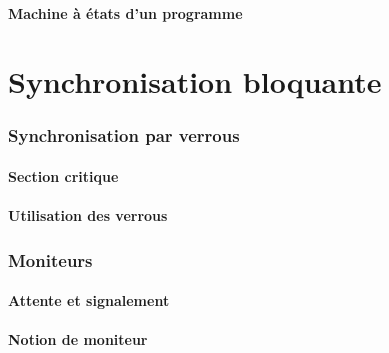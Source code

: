 \documentclass[9pt]{beamer}
\begin{document}
\subsection{Machine à états d'un programme}



 
 
\part{Synchronisation bloquante}
 
 
\section{Synchronisation par verrous}
 
\subsection{Section critique}







 
\subsection{Utilisation des verrous}









 
\section{Moniteurs}
 
\subsection{Attente et signalement}



 
\subsection{Notion de moniteur}




 
\end{document}
